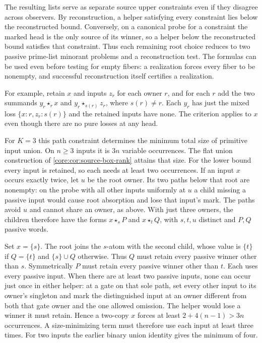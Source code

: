 The resulting lists serve as separate source
upper constraints even if they disagree across
observers. By reconstruction, a helper satisfying
every constraint lies below the reconstructed
bound. Conversely, on a canonical probe for a
constraint the marked head is the only source of
its winner, so a helper below the reconstructed
bound satisfies that constraint. Thus each
remaining root choice reduces to two passive
prime-list minorant problems and a reconstruction
test. The formulas can be used even before
testing for empty fibers: a realization forces
every fiber to be nonempty, and successful
reconstruction itself certifies a realization.

For example, retain $x$ and inputs $z_r$ for
each owner $r$, and for each $r$ add the two
summands $y_r\star_r x$ and $y_r\star_{s(r)}z_r$,
where $s(r)\ne r$. Each $y_r$ has just the mixed
loss $\{x:r,z_r:s(r)\}$ and the retained inputs
have none. The criterion applies to $x$ even
though there are no pure losses at any head.

For $K=3$ this path constraint determines the
minimum total size of primitive input union. On
$n\ge3$ inputs it is $3n$ variable occurrences.
The flat union construction of
\cref{core:cor:source-box-rank} attains that size.
For the lower bound every input is retained, so
each needs at least two occurrences. If an input
$x$ occurs exactly twice, let $u$ be the root
owner. Its two paths below that root are nonempty:
on the probe with all other inputs uniformly at
$u$ a child missing a passive input would cause
root absorption and lose that input's mark.
The paths avoid $u$ and cannot share an owner,
as above. With just three owners, the children
therefore have the forms $x\star_s P$ and
$x\star_t Q$, with $s,t,u$ distinct and $P,Q$
passive words.

Set $x=\{s\}$. The root joins the $s$-atom
with the second child, whose value is $\{t\}$
if $Q=\{t\}$ and $\{s\}\cup Q$ otherwise.
Thus $Q$ must retain every passive winner other
than $s$. Symmetrically $P$ must retain every
passive winner other than $t$. Each uses every
passive input. When there are at least two
passive inputs, none can occur just once in
either helper: at a gate on that sole path,
set every other input to its owner's singleton
and mark the distinguished input at an owner
different from both that gate owner and the
one allowed omission. The helper would lose
a winner it must retain. Hence a two-copy
$x$ forces at least $2+4(n-1)>3n$ occurrences.
A size-minimizing term must therefore use each
input at least three times. For two inputs the
earlier binary union identity gives the minimum
of four.

